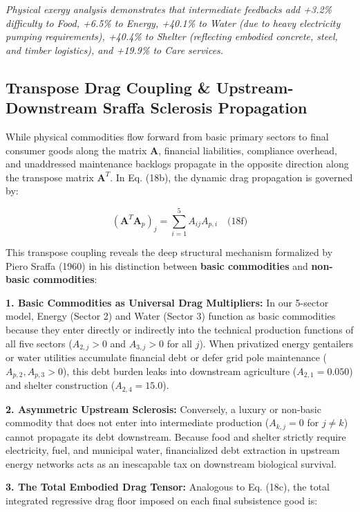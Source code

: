 \documentclass[preprint,12pt,authoryear]{elsarticle}
\theoremstyle{definition}
\begin{document}
\textit{Physical exergy analysis demonstrates that intermediate feedbacks add +3.2\% difficulty to Food, +6.5\% to Energy, +40.1\% to Water (due to heavy electricity pumping requirements), +40.4\% to Shelter (reflecting embodied concrete, steel, and timber logistics), and +19.9\% to Care services.}

\subsection{Transpose Drag Coupling \& Upstream-Downstream Sraffa Sclerosis Propagation}

While physical commodities flow forward from basic primary sectors to final consumer goods along the matrix $\mathbf{A}$, financial liabilities, compliance overhead, and unaddressed maintenance backlogs propagate in the opposite direction along the transpose matrix $\mathbf{A}^T$. In Eq. (18b), the dynamic drag propagation is governed by:

$$\left(\mathbf{A}^T \mathbf{A}_p\right)_j = \sum_{i=1}^5 A_{ij} A_{p,i} \quad \text{(18f)}$$

This transpose coupling reveals the deep structural mechanism formalized by Piero Sraffa (1960) in his distinction between \textbf{basic commodities} and \textbf{non-basic commodities}:

\textbf{1. Basic Commodities as Universal Drag Multipliers:} In our 5-sector model, Energy (Sector 2) and Water (Sector 3) function as basic commodities because they enter directly or indirectly into the technical production functions of all five sectors ($A_{2,j} > 0$ and $A_{3,j} > 0$ for all $j$). When privatized energy gentailers or water utilities accumulate financial debt or defer grid pole maintenance ($A_{p,2}, A_{p,3} > 0$), this debt burden leaks into downstream agriculture ($A_{2,1} = 0.050$) and shelter construction ($A_{2,4} = 15.0$).

\textbf{2. Asymmetric Upstream Sclerosis:} Conversely, a luxury or non-basic commodity that does not enter into intermediate production ($A_{k,j} = 0$ for $j \neq k$) cannot propagate its debt downstream. Because food and shelter strictly require electricity, fuel, and municipal water, financialized debt extraction in upstream energy networks acts as an inescapable tax on downstream biological survival.

\textbf{3. The Total Embodied Drag Tensor:} Analogous to Eq. (18c), the total integrated regressive drag floor imposed on each final subsistence good is:
\end{document}
